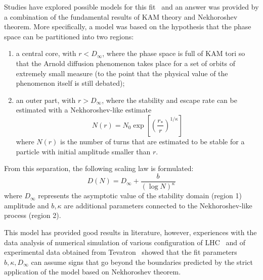 Studies have explored possible models for this fit~\cite{giovannozzi1996prediction, giovannozzi1998dynamic} and an answer was provided by a combination of the fundamental results of KAM theory and Nekhoroshev theorem. More specifically, a model was based on the hypothesis that the phase space can be partitioned into two regions:
\begin{enumerate}
	\item a central core, with \(r < D_\infty\), where the phase space is full of KAM tori so that the Arnold diffusion phenomenon takes place for a set of orbits of extremely small measure (to the point that the physical value of the phenomenon itself is still debated);
	\item an outer part, with \(r > D_\infty\), where the stability and escape rate can be estimated with a Nekhoroshev-like estimate
	\begin{equation}
		N(r) = N_0 \exp\left[\left(\frac{r_\ast}{r}\right)^{1/\kappa}\right]
	\end{equation}
	where \(N(r)\) is the number of turns that are estimated to be stable for a particle with initial amplitude smaller than \(r\).
\end{enumerate}
From this separation, the following scaling law is formulated:
\begin{equation}
	D(N) = D_\infty + \frac{b}{(\log N)^\kappa}
	\label{eq:giova_interpolation}
\end{equation}
where \(D_\infty\) represents the asymptotic value of the stability domain (region 1) amplitude and \(b, \kappa\) are additional parameters connected to the Nekhoroshev-like process (region 2).

This model has provided good results in literature, however, experiences with the data analysis of numerical simulation of various configuration of LHC~\cite{giovannozzi1998dynamic} and of experimental data obtained from Tevatron~\cite{giovannozzi2012proposed} showed that the fit parameters \(b, \kappa, D_\infty\) can assume signs that go beyond the boundaries predicted by the strict application of the model based on Nekhoroshev theorem.

